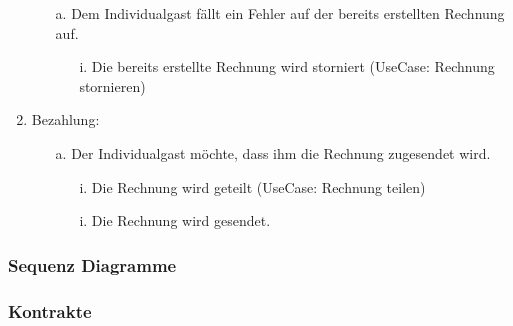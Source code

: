 \documentclass[./detailed_overview_usecases.tex]{subfiles}
\begin{document}
\begin{enumerate}
        \begin{itemize}
            \item[a.] Dem Individualgast fällt ein Fehler auf der bereits erstellten Rechnung auf.
            \begin{itemize}
                \item[i.] Die bereits erstellte Rechnung wird storniert (UseCase: Rechnung stornieren)
            \end{itemize}
        \end{itemize}
        \setcounter{enumi}{5}
        \item Bezahlung: \begin{itemize}
                             \item[a.] Der Individualgast möchte, dass ihm die Rechnung zugesendet wird.
                             \begin{itemize}
                                 \item[i.] Die Rechnung wird geteilt (UseCase: Rechnung teilen)
                                 \item[i.] Die Rechnung wird gesendet.
                             \end{itemize}
        \end{itemize}
    \end{enumerate}

    \subsubsection{Sequenz Diagramme}
    \subsubsection{Kontrakte}
\end{document}
